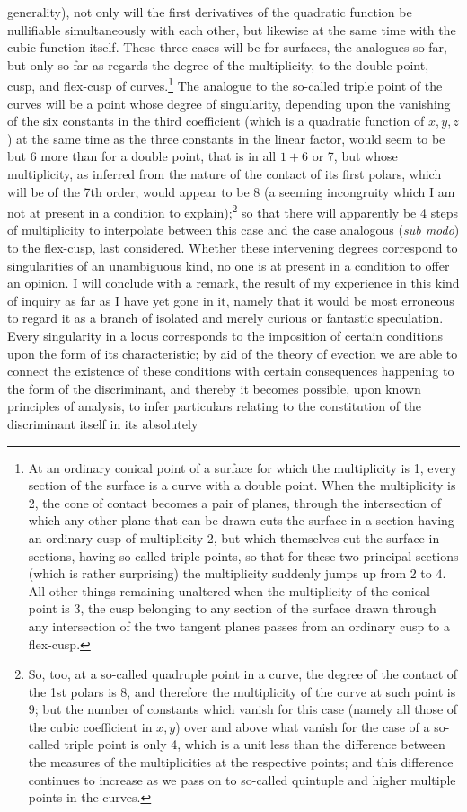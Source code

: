 \documentclass[11pt]{article}
\newcommand{\sourcepage}[1]{\marginpar{\scriptsize p.~#1}}
\begin{document}
\sourcepage{375}
generality), not only will the first derivatives of the quadratic function be nullifiable simultaneously with each other, but likewise at the same time with the cubic function itself. These three cases will be for surfaces, the analogues so far, but only so far as regards the degree of the multiplicity, to the double point, cusp, and flex-cusp of curves.\footnote{At an ordinary conical point of a surface for which the multiplicity is 1, every section of the surface is a curve with a double point. When the multiplicity is 2, the cone of contact becomes a pair of planes, through the intersection of which any other plane that can be drawn cuts the surface in a section having an ordinary cusp of multiplicity 2, but which themselves cut the surface in sections, having so-called triple points, so that for these two principal sections (which is rather surprising) the multiplicity suddenly jumps up from 2 to 4. All other things remaining unaltered when the multiplicity of the conical point is 3, the cusp belonging to any section of the surface drawn through any intersection of the two tangent planes passes from an ordinary cusp to a flex-cusp.} The analogue to the so-called triple point of the curves will be a point whose degree of singularity, depending upon the vanishing of the six constants in the third coefficient (which is a quadratic function of $x,y,z$) at the same time as the three constants in the linear factor, would seem to be but 6 more than for a double point, that is in all $1+6$ or 7, but whose multiplicity, as inferred from the nature of the contact of its first polars, which will be of the 7th order, would appear to be 8 (a seeming incongruity which I am not at present in a condition to explain);\footnote{So, too, at a so-called quadruple point in a curve, the degree of the contact of the 1st polars is 8, and therefore the multiplicity of the curve at such point is 9; but the number of constants which vanish for this case (namely all those of the cubic coefficient in $x,y$) over and above what vanish for the case of a so-called triple point is only 4, which is a unit less than the difference between the measures of the multiplicities at the respective points; and this difference continues to increase as we pass on to so-called quintuple and higher multiple points in the curves.} so that there will apparently be 4 steps of multiplicity to interpolate between this case and the case analogous (\emph{sub modo}) to the flex-cusp, last considered. Whether these intervening degrees correspond to singularities of an unambiguous kind, no one is at present in a condition to offer an opinion. I will conclude with a remark, the result of my experience in this kind of inquiry as far as I have yet gone in it, namely that it would be most erroneous to regard it as a branch of isolated and merely curious or fantastic speculation. Every singularity in a locus corresponds to the imposition of certain conditions upon the form of its characteristic; by aid of the theory of evection we are able to connect the existence of these conditions with certain consequences happening to the form of the discriminant, and thereby it becomes possible, upon known principles of analysis, to infer particulars relating to the constitution of the discriminant itself in its absolutely 
\end{document}
